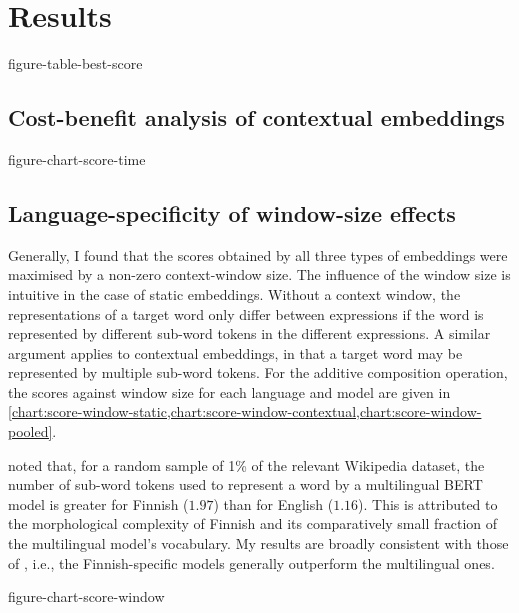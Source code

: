 \section{Results}
\label{sec:results}

{figure-table-best-score}

\subsection{Cost-benefit analysis of contextual embeddings}
\label{sec:cost-benefit}

{figure-chart-score-time}


\subsection{Language-specificity of window-size effects}

Generally, I found that the scores obtained by all three types of embeddings were
maximised by a non-zero context-window size.
The influence of the window size is intuitive in the case of static embeddings.
Without a context window, the representations of a target word only differ between
expressions if the word is represented by different sub-word tokens in the different
expressions.
A similar argument applies to contextual embeddings, in that a target word may be
represented by multiple sub-word tokens.
For the additive composition operation, the scores against window size for each
language and model are given in
\cref{chart:score-window-static,chart:score-window-contextual,chart:score-window-pooled}.

\textcite[3]{Virtanen2019} noted that, for a random sample of 1\% of the relevant
Wikipedia dataset, the number of sub-word tokens used to represent a word by a
multilingual BERT model is greater for Finnish ($1.97$) than for English ($1.16$).
This is attributed to the morphological complexity of Finnish and its comparatively
small fraction of the multilingual model's vocabulary.
My results are broadly consistent with those of \citeauthor{Virtanen2019}, i.e., the
Finnish-specific models generally outperform the multilingual ones.

{figure-chart-score-window}
